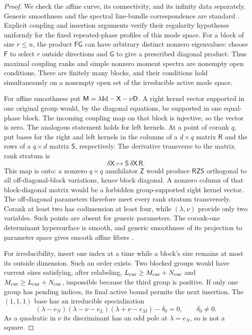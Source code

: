 \begin{proof}
We check the affine curve, its connectivity, and its infinity data
separately. Generic smoothness and the spectral line-bundle
correspondence are standard \cite{Hartshorne1977,Beauville1990,AdamsHarnadHurtubise1990II}.
Explicit coupling and insertion arguments verify their
regularity hypotheses uniformly for the fixed repeated-phase profiles
of this mode space. For a block of size $r\leq n$, the product $\mathsf F\mathsf G$ can have
arbitrary distinct nonzero eigenvalues: choose $\mathsf F$ to select $r$
outside directions and $\mathsf G$ to give a prescribed diagonal product.
Thus maximal coupling ranks and simple nonzero moment spectra are
nonempty open conditions. There are finitely many blocks, and their
conditions hold simultaneously on a nonempty open set of the
irreducible active mode space.

For affine smoothness put
$\mathsf M=\lambda\mathrm{Id}-\mathsf X-\nu\mathsf D$.
A right kernel vector supported in one original group would, by
the diagonal equations, be supported in one equal-phase block.
The incoming coupling map on that block is injective, so the vector
is zero. The analogous statement holds for left kernels. At a point
of corank $q$, put bases for the right and left kernels in the
columns of a $d\times q$ matrix $\mathsf R$ and the rows of a
$q\times d$ matrix $\mathsf S$, respectively. The derivative
transverse to the matrix rank stratum is
\[
 \delta\mathsf X\longmapsto \mathsf S\,\delta\mathsf X\,\mathsf R.
\]
This map is onto: a nonzero $q\times q$ annihilator $\mathsf Z$
would produce $\mathsf R\mathsf Z\mathsf S$
orthogonal to all off-diagonal-block variations, hence block diagonal.
A nonzero column of that block-diagonal matrix would be a forbidden
group-supported right kernel vector. The off-diagonal parameters
therefore meet every rank stratum transversely. Corank at least two
has codimension at least four, while $(\lambda,\nu)$ provide only two
variables. Such points are absent for generic parameters. The
corank-one determinant hypersurface is smooth, and generic smoothness
of its projection to parameter space gives smooth affine fibers
\cite[Chapter~III]{Hartshorne1977}.

For irreducibility, insert one index at a time while a block's
size remains at most its outside dimension. Such an order exists.
Two blocked groups would have current sizes satisfying, after
relabeling, $L_{\rm cur}\geq M_{\rm cur}+N_{\rm cur}$ and
$M_{\rm cur}\geq L_{\rm cur}+N_{\rm cur}$, impossible because the
third group is positive. If only one group has pending indices,
its final active bound permits the next insertion.
The $(1,1,1)$ base has an irreducible specialization
\[
 (\lambda-e_N)(\lambda-\nu-e_L)(\lambda+\nu-e_M)-\delta_0=0,
 \qquad \delta_0\ne0.
\]
As a quadratic in $\nu$ its discriminant has an odd pole at
$\lambda=e_N$, so is not a square.


\end{proof}
